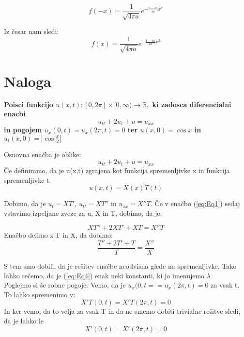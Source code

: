 \documentclass[11pt, a4paper]{article}
\theoremstyle{definition}
\theoremstyle{example}
\theoremstyle{izrek}
\begin{document}
$$f(-x)=\frac{1}{\sqrt{4\pi a}}e^{-\frac{1-4a}{4a}x^2}$$

Iz česar nam sledi: 
\begin{equation}
\label{eq:Eq34}
f(x)=\frac{1}{\sqrt{4\pi a}}e^{-\frac{1-4a}{4a}x^2}
\end{equation}

\pagebreak

\section{Naloga}
\textbf{ Poisci funkcijo $u(x, t):[0,2 \pi] \times[0, \infty) \rightarrow \mathbb{R},$ ki zadosca diferencialni enacbi
\[
u_{t t}+2 u_{t}+u=u_{x x}
\]
in pogojem $u_{x}(0, t)=u_{x}(2 \pi, t)=0$ ter $u(x, 0)=\cos x$ in $u_{t}(x, 0)=\left|\cos \frac{x}{2}\right|$}
\medskip

Osnovna enačba je oblike:
\begin{equation}
\label{eq:Eq1}
u_{tt}+2u_{t}+u=u_{xx}
\end{equation}
Če definiramo, da je u(x,t) zgrajena kot funkcija spremenljivke x in funkcija spremenljivke t. 
\begin{equation} 
\label{eq:Eq2}
	   u(x,t)=X(x)T(t)\end{equation}
	   
Dobimo, da je $u_{t}=XT'$,  $u_{tt}=XT''$ in $u_{xx}=X''T$. Če v enačbo (\ref{eq:Eq1}) sedaj vstavimo izpeljane zveze za u, X in T, dobimo, da je: 

\begin{equation}
\label{eq:Eq3}
XT''+2XT'+XT=X''T
\end{equation}
Enačbo delimo z T in X, da dobimo:
\begin{equation}
\label{eq:Eq4}
\frac{T''+2T'+T}{T}=\frac{X''}{X}
\end{equation}

S tem smo dobili, da je rešitev enačbe neodvisna glede na spremenljivke. Tako lahko rečemo, da je (\ref{eq:Eq4}) enak neki konstanti, ki jo imenujemo $\lambda$ \\
Poglejmo si še robne pogoje. Vemo, da je $u_{x}(0,t==u_{x}(2\pi ,t)=0$ za vsak t. To lahko spremenimo v:
\begin{equation}
\label{eq:Eq5}
X'T(0,t)=X'T(2\pi,t)=0
\end{equation}
In ker vemo, da to velja za vsak T in da ne smemo dobiti trivialne rešitve sledi, da je lahko le 
\begin{equation}
\label{eq:Eq6}
X'(0,t)=X'(2 \pi, t)=0
\end{equation}
\end{document}
